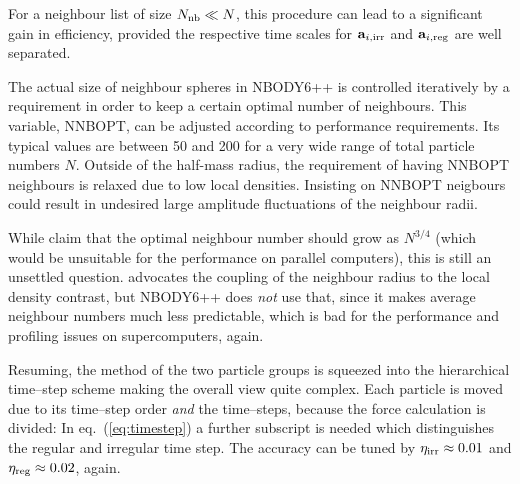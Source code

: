 For a neighbour list of size $N_{\rm nb} \ll N$, this procedure
can lead to a significant gain in efficiency, provided the
respective time scales for $\mathbf a_{i,{\rm irr}}$ and
$\mathbf a_{i,{\rm reg}}$ are well separated.

The actual size of neighbour spheres in NBODY6++ is controlled
iteratively by a requirement in order to keep a certain
optimal number of neighbours.
This variable, NNBOPT, can be adjusted according to performance
requirements.
Its typical values are between 50 and 200 for a very wide range
of total particle numbers $N$.
Outside of the half-mass radius, the requirement of having
NNBOPT neighbours is relaxed due to low local densities.
Insisting on NNBOPT neigbours could result in undesired large
amplitude fluctuations of the neighbour radii.

While \cite{mh_88} claim that the optimal neighbour number
should grow as $N^{3/4}$ (which would be unsuitable for the
performance on parallel computers), this is still an
unsettled question.
\cite{a_85} advocates the coupling of the neighbour radius
to the local density contrast,
but NBODY6++ does \emph{not} use that, since it makes average
neighbour numbers much less predictable, which is bad for
the performance and profiling issues on supercomputers, again.

Resuming, the method of the two particle groups is squeezed
into the hierarchical time--step scheme making the overall
view quite complex.
Each particle is moved due to its time--step order \emph{and}
the time--steps, because the force calculation is divided:
In eq.~(\ref{eq:timestep}) a further subscript is needed
which distinguishes the regular and irregular time step.
The accuracy can be tuned by $\eta_{\rm irr} \approx 0.01$
and $\eta_{\rm reg} \approx 0.02$, again.

